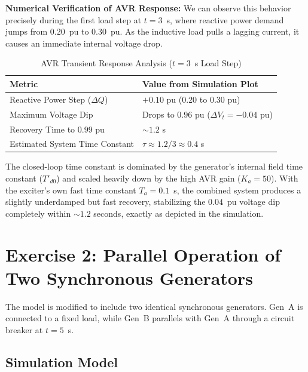 \documentclass[12pt, a4paper]{article}
\begin{document}
\textbf{Numerical Verification of AVR Response:}
We can observe this behavior precisely during the first load step at $t=3$~s, where reactive power demand jumps from $0.20$~pu to $0.30$~pu. As the inductive load pulls a lagging current, it causes an immediate internal voltage drop.

\begin{table}[H]
    \centering
    \caption{AVR Transient Response Analysis ($t = 3$~s Load Step)}
    \begin{tabular}{lp{10cm}}
        \toprule
        \textbf{Metric} & \textbf{Value from Simulation Plot} \\
        \midrule
        Reactive Power Step ($\Delta Q$) & $+0.10$ pu (0.20 to 0.30 pu) \\
        Maximum Voltage Dip              & Drops to $0.96$ pu ($\Delta V_t = -0.04$ pu) \\
        Recovery Time to $0.99$ pu       & $\sim 1.2$ s \\
        Estimated System Time Constant   & $\tau \approx 1.2 / 3 \approx 0.4$ s \\
        \bottomrule
    \end{tabular}
    \label{tab:avr_transient}
\end{table}

The closed-loop time constant is dominated by the generator's internal field time constant ($T'_{d0}$) and scaled heavily down by the high AVR gain ($K_a = 50$). With the exciter's own fast time constant $T_a = 0.1$~s, the combined system produces a slightly underdamped but fast recovery, stabilizing the $0.04$~pu voltage dip completely within $\sim 1.2$ seconds, exactly as depicted in the simulation.

\newpage

\section{Exercise 2: Parallel Operation of Two Synchronous Generators}

The model is modified to include two identical synchronous generators. Gen~A is connected to a fixed load, while Gen~B parallels with Gen~A through a circuit breaker at $t = 5$~s.

\subsection{Simulation Model}
\end{document}
